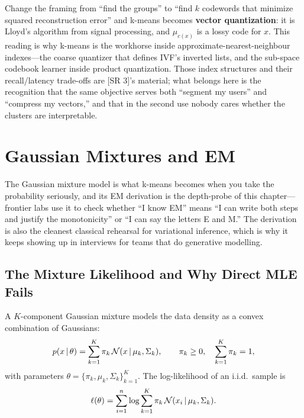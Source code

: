 \begin{keyinsight}
Change the framing from ``find the groups'' to ``find $k$ codewords that minimize squared reconstruction error'' and k-means becomes \textbf{vector quantization}: it is Lloyd's algorithm from signal processing, and $\mu_{c(x)}$ is a lossy code for $x$. This reading is why k-means is the workhorse inside approximate-nearest-neighbour indexes---the coarse quantizer that defines IVF's inverted lists, and the sub-space codebook learner inside product quantization. Those index structures and their recall/latency trade-offs are [SR 3]'s material; what belongs here is the recognition that the same objective serves both ``segment my users'' and ``compress my vectors,'' and that in the second use nobody cares whether the clusters are interpretable.
\end{keyinsight}

\section{Gaussian Mixtures and EM}
\label{cml:sec:gmm_em}

The Gaussian mixture model is what k-means becomes when you take the probability seriously, and its EM derivation is the depth-probe of this chapter---frontier labs use it to check whether ``I know EM'' means ``I can write both steps and justify the monotonicity'' or ``I can say the letters E and M.'' The derivation is also the cleanest classical rehearsal for variational inference, which is why it keeps showing up in interviews for teams that do generative modelling.

\subsection{The Mixture Likelihood and Why Direct MLE Fails}

A $K$-component Gaussian mixture models the data density as a convex combination of Gaussians:
\begin{equation}
p(x \,|\, \theta) = \sum_{k=1}^{K} \pi_k \, \mathcal{N}(x \,|\, \mu_k, \Sigma_k), \qquad \pi_k \ge 0, \quad \sum_{k=1}^K \pi_k = 1,
\end{equation}
with parameters $\theta = \{\pi_k, \mu_k, \Sigma_k\}_{k=1}^K$. The log-likelihood of an i.i.d.\ sample is
\begin{equation}
\ell(\theta) = \sum_{i=1}^{n} \log \sum_{k=1}^{K} \pi_k \, \mathcal{N}(x_i \,|\, \mu_k, \Sigma_k).
\label{eq:cml:gmm_loglik}
\end{equation}

